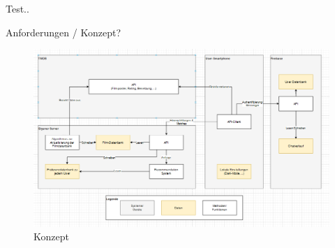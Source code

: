 Test..

Anforderungen / Konzept?

\begin{figure}[h]
\centering
\includegraphics[width=14cm]{images/Konzept.PNG}
\caption{Konzept}
\end{figure}